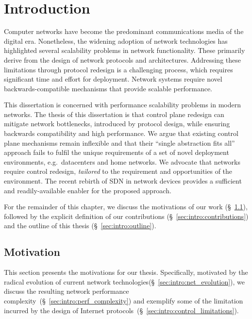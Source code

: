 \chapter{Introduction} \label{s:introduction:introduction}

Computer networks have become the predominant communications media of the
digital era. Nonetheless, the widening adoption of network technologies has
highlighted several scalability problems in network functionality. These
primarily derive from the design of network protocols and architectures.
Addressing these limitations through protocol redesign is a challenging process,
which requires significant time and effort for deployment. Network systems
require novel backwards-compatible mechanisms that provide scalable performance. 

This dissertation is concerned with performance scalability problems in modern
networks.  The thesis of this dissertation is that control plane redesign can
mitigate network bottlenecks, introduced by protocol design, while ensuring
backwards compatibility and high performance. We argue that existing control
plane mechanisms remain inflexible and that their ``single abstraction fits all''
approach fails to fulfil the unique requirements of a set of novel deployment
environments, e.g.~datacenters and home networks.  We advocate that
networks require control redesign, \textit{tailored} to the requirement and
opportunities of  the environment. The recent rebirth of SDN in network devices
provides a sufficient and readily-available enabler for the proposed approach. 

For the remainder of this chapter, we discuss the motivations of our work
(\S~\ref{sec:intro:motivations}), followed by the explicit definition of our
contributions (\S~\ref{sec:intro:contributions}) and  the outline of this thesis
(\S~\ref{sec:intro:outline}).

\section{Motivation} \label{sec:intro:motivations}

This section presents the motivations for our thesis. Specifically, motivated by
the radical evolution of current network
technologies(\S~\ref{sec:intro:net_evolution}), we discuss the resulting network
performance complexity~(\S~\ref{sec:intro:perf_complexity}) and exemplify some
of the limitation incurred by the design of Internet
protocols~(\S~\ref{sec:intro:control_limitations}).

